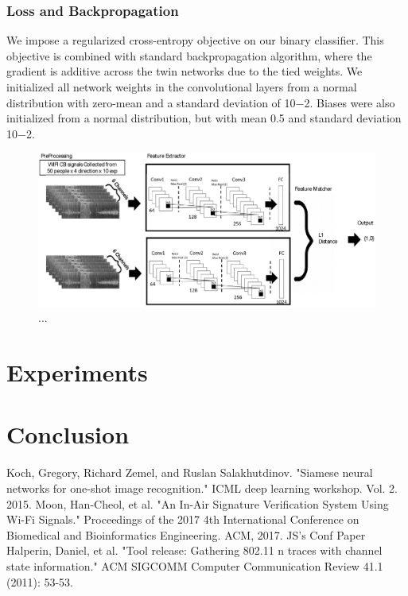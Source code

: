 \documentclass[runningheads]{llncs}
\begin{document}
\subsubsection{Loss and Backpropagation}
 We impose a regularized cross-entropy objective on our binary classifier.
This objective is combined with standard backpropagation algorithm, where the gradient is additive across the twin networks due to the tied weights.
 We initialized all network weights in the convolutional layers from a normal distribution with zero-mean and a standard deviation of 10−2. Biases were also initialized from a normal distribution, but with mean 0.5 and standard deviation 10−2.
\begin{figure}
\includegraphics[width=\textwidth]{network1.eps}
\caption{...} \label{network1}
\end{figure}

\section{Experiments}
\section{Conclusion}

%
%
%
% 
% 
%
\begin{thebibliography}{8}
Koch, Gregory, Richard Zemel, and Ruslan Salakhutdinov.
 "Siamese neural networks for one-shot image recognition." 
 ICML deep learning workshop. Vol. 2. 2015.
Moon, Han-Cheol, et al. "An In-Air Signature Verification System Using Wi-Fi Signals." Proceedings of the 2017 4th International Conference on Biomedical and Bioinformatics Engineering. ACM, 2017.
JS's Conf Paper
Halperin, Daniel, et al. "Tool release: Gathering 802.11 n traces with channel state information." ACM SIGCOMM Computer Communication Review 41.1 (2011): 53-53.




\end{thebibliography}
\end{document}
